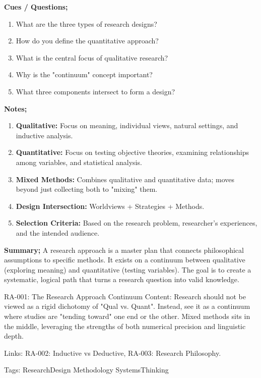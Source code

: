 \documentclass{report}
\begin{document}
\begin{cornellnotes}
    \textbf{Cues / Questions;}
    \begin{enumerate}
        \item What are the three types of research designs?
        \item How do you define the quantitative approach?
        \item What is the central focus of qualitative research?
        \item Why is the "continuum" concept important?
        \item What three components intersect to form a design?
    \end{enumerate}
    \textbf{Notes;}
    \begin{enumerate}
        \item \textbf{Qualitative:} Focus on meaning, individual views, natural settings, and inductive analysis.
        \item \textbf{Quantitative:} Focus on testing objective theories, examining relationships among variables, and statistical analysis.
        \item \textbf{Mixed Methods:} Combines qualitative and quantitative data; moves beyond just collecting both to "mixing" them.
        \item \textbf{Design Intersection:} Worldviews + Strategies + Methods.
        \item \textbf{Selection Criteria:} Based on the research problem, researcher's experiences, and the intended audience.
    \end{enumerate}
    \textbf{Summary;}
    A research approach is a master plan that connects philosophical assumptions to specific methods. It exists on a continuum between qualitative (exploring meaning) and quantitative (testing variables). The goal is to create a systematic, logical path that turns a research question into valid knowledge.
\end{cornellnotes}

\begin{zettelkasteinnotes}
    RA-001: The Research Approach Continuum Content: Research should not be viewed as a rigid dichotomy of "Qual vs. Quant". Instead, see it as a continuum where studies are "tending toward" one end or the other. Mixed methods sits in the middle, leveraging the strengths of both numerical precision and linguistic depth. 
    
    Links: RA-002: Inductive vs Deductive, RA-003: Research Philosophy. 
    
    Tags: ResearchDesign Methodology SystemsThinking
\end{zettelkasteinnotes}
\end{document}
